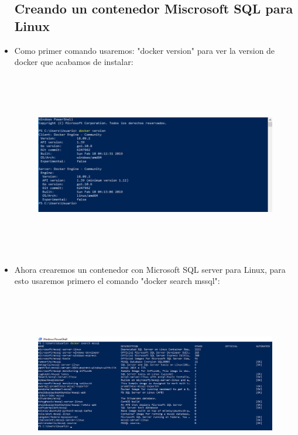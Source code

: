 \begin{itemize}
	\subsection{Creando un contenedor Miscrosoft SQL para Linux}
	
	\item Como primer comando usaremos:  "docker version" para ver la    version de docker que acabamos de instalar:\\
	
	
	\begin{figure}[htb]
	\begin{center}
	\includegraphics[width=16cm, height=8cm]{./Imagenes/dockerversion}
	\end{center}
	\end{figure}
	
	\item Ahora crearemos un contenedor con Microsoft SQL server para Linux, para esto usaremos primero el comando "docker search mssql":\\
	
	
	\begin{figure}[htb]
	\begin{center}
	\includegraphics[width=16cm, height=8cm]{./Imagenes/dockersearch}
	\end{center}
	\end{figure}
	\clearpage
	

\end{itemize}
